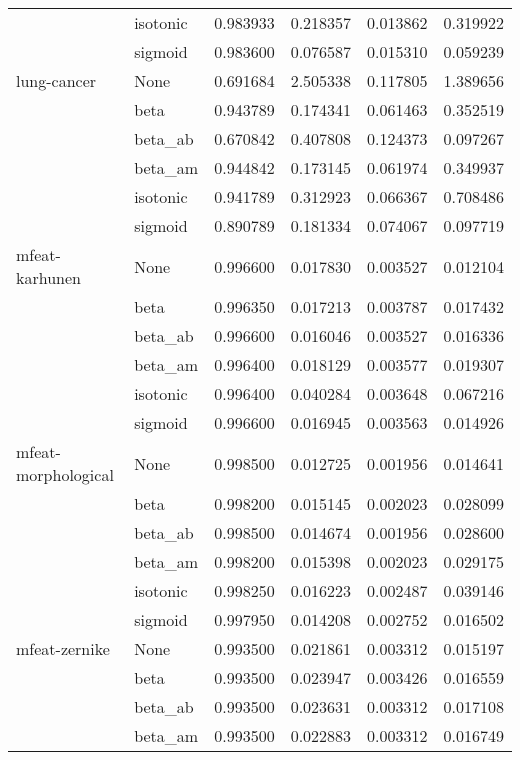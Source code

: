 \begin{tabular}{llrrrr}
        & isotonic &  0.983933 &  0.218357 &  0.013862 &  0.319922 \\
        & sigmoid &  0.983600 &  0.076587 &  0.015310 &  0.059239 \\
lung-cancer & None &  0.691684 &  2.505338 &  0.117805 &  1.389656 \\
        & beta &  0.943789 &  0.174341 &  0.061463 &  0.352519 \\
        & beta\_ab &  0.670842 &  0.407808 &  0.124373 &  0.097267 \\
        & beta\_am &  0.944842 &  0.173145 &  0.061974 &  0.349937 \\
        & isotonic &  0.941789 &  0.312923 &  0.066367 &  0.708486 \\
        & sigmoid &  0.890789 &  0.181334 &  0.074067 &  0.097719 \\
mfeat-karhunen & None &  0.996600 &  0.017830 &  0.003527 &  0.012104 \\
        & beta &  0.996350 &  0.017213 &  0.003787 &  0.017432 \\
        & beta\_ab &  0.996600 &  0.016046 &  0.003527 &  0.016336 \\
        & beta\_am &  0.996400 &  0.018129 &  0.003577 &  0.019307 \\
        & isotonic &  0.996400 &  0.040284 &  0.003648 &  0.067216 \\
        & sigmoid &  0.996600 &  0.016945 &  0.003563 &  0.014926 \\
mfeat-morphological & None &  0.998500 &  0.012725 &  0.001956 &  0.014641 \\
        & beta &  0.998200 &  0.015145 &  0.002023 &  0.028099 \\
        & beta\_ab &  0.998500 &  0.014674 &  0.001956 &  0.028600 \\
        & beta\_am &  0.998200 &  0.015398 &  0.002023 &  0.029175 \\
        & isotonic &  0.998250 &  0.016223 &  0.002487 &  0.039146 \\
        & sigmoid &  0.997950 &  0.014208 &  0.002752 &  0.016502 \\
mfeat-zernike & None &  0.993500 &  0.021861 &  0.003312 &  0.015197 \\
        & beta &  0.993500 &  0.023947 &  0.003426 &  0.016559 \\
        & beta\_ab &  0.993500 &  0.023631 &  0.003312 &  0.017108 \\
        & beta\_am &  0.993500 &  0.022883 &  0.003312 &  0.016749 \\

\end{tabular}
